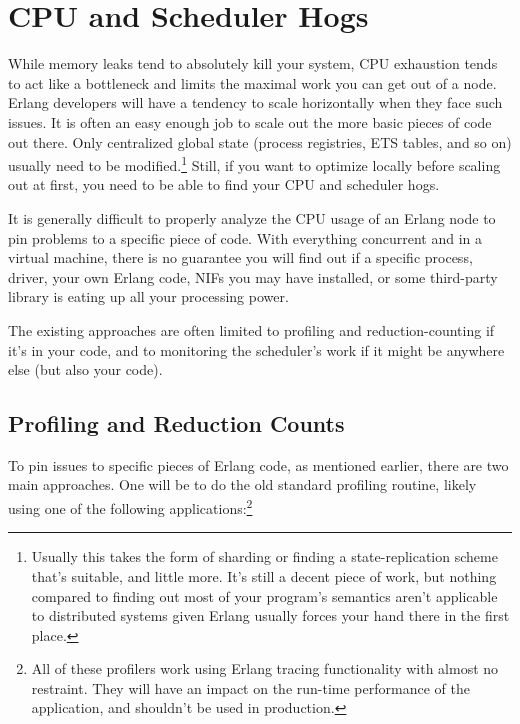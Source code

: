\chapter{CPU and Scheduler Hogs}
\label{chap:cpu-hogs}

While memory leaks tend to absolutely kill your system, CPU exhaustion tends to act like a bottleneck and limits the maximal work you can get out of a node. Erlang developers will have a tendency to scale horizontally when they face such issues. It is often an easy enough job to scale out the more basic pieces of code out there. Only centralized global state (process registries, ETS tables, and so on) usually need to be modified.\footnote{Usually this takes the form of sharding or finding a state-replication scheme that's suitable, and little more. It's still a decent piece of work, but nothing compared to finding out most of your program's semantics aren't applicable to distributed systems given Erlang usually forces your hand there in the first place.} Still, if you want to optimize locally before scaling out at first, you need to be able to find your CPU and scheduler hogs.

It is generally difficult to properly analyze the CPU usage of an Erlang node to pin problems to a specific piece of code. With everything concurrent and in a virtual machine, there is no guarantee you will find out if a specific process, driver, your own Erlang code, NIFs you may have installed, or some third-party library is eating up all your processing power.

The existing approaches are often limited to profiling and reduction-counting if it's in your code, and to monitoring the scheduler's work if it might be anywhere else (but also your code).

\section{Profiling and Reduction Counts}
\label{sec:cpu-profiling}

To pin issues to specific pieces of Erlang code, as mentioned earlier, there are two main approaches. One will be to do the old standard profiling routine, likely using one of the following applications:\footnote{All of these profilers work using Erlang tracing functionality with almost no restraint. They will have an impact on the run-time performance of the application, and shouldn't be used in production.}

